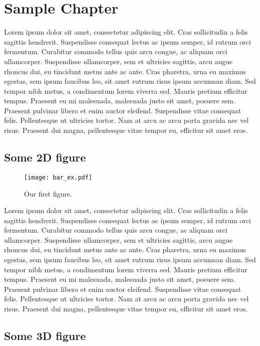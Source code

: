 \documentclass[10pt]{report}
\begin{document}
\chapter{Sample Chapter}

Lorem ipsum dolor sit amet, consectetur adipiscing elit. Cras sollicitudin a felis sagittis hendrerit. Suspendisse consequat lectus ac ipsum semper, id rutrum orci fermentum. Curabitur commodo tellus quis arcu congue, ac aliquam orci ullamcorper. Suspendisse ullamcorper, sem et ultricies sagittis, arcu augue rhoncus dui, eu tincidunt metus ante ac ante. Cras pharetra, urna eu maximus egestas, sem ipsum faucibus leo, sit amet rutrum risus ipsum accumsan diam. Sed tempor nibh metus, a condimentum lorem viverra sed. Mauris pretium efficitur tempus. Praesent eu mi malesuada, malesuada justo sit amet, posuere sem. Praesent pulvinar libero et enim auctor eleifend. Suspendisse vitae consequat felis. Pellentesque ut ultricies tortor. Nam at arcu ac arcu porta gravida nec vel risus. Praesent dui magna, pellentesque vitae tempor eu, efficitur sit amet eros.

\section{Some 2D figure}

\begin{figure}[H]
	\centering
	\texttt{[image: bar\_ex.pdf]}
	\caption{Our first figure.}
\end{figure}

Lorem ipsum dolor sit amet, consectetur adipiscing elit. Cras sollicitudin a felis sagittis hendrerit. Suspendisse consequat lectus ac ipsum semper, id rutrum orci fermentum. Curabitur commodo tellus quis arcu congue, ac aliquam orci ullamcorper. Suspendisse ullamcorper, sem et ultricies sagittis, arcu augue rhoncus dui, eu tincidunt metus ante ac ante. Cras pharetra, urna eu maximus egestas, sem ipsum faucibus leo, sit amet rutrum risus ipsum accumsan diam. Sed tempor nibh metus, a condimentum lorem viverra sed. Mauris pretium efficitur tempus. Praesent eu mi malesuada, malesuada justo sit amet, posuere sem. Praesent pulvinar libero et enim auctor eleifend. Suspendisse vitae consequat felis. Pellentesque ut ultricies tortor. Nam at arcu ac arcu porta gravida nec vel risus. Praesent dui magna, pellentesque vitae tempor eu, efficitur sit amet eros.

\section{Some 3D figure}
\end{document}
